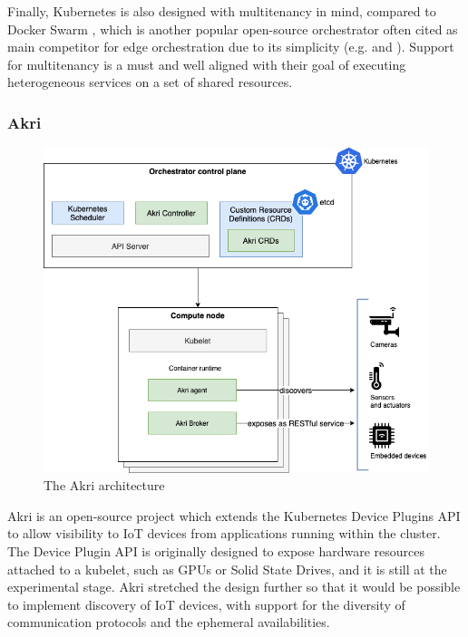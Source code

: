 Finally, Kubernetes is also designed with multitenancy in mind, compared to Docker Swarm \cite{docker-swarm}, which is another popular open-source orchestrator often cited as main competitor for edge orchestration due to its simplicity (e.g. \cite{containers-fog} and \cite{docker-edge-computing}). Support for multitenancy is a must and well aligned with their goal of executing heterogeneous services on a set of shared resources.

\subsubsection{Akri}
\label{sec:akri}

\begin{figure}[h]
\centering
\includegraphics[width=\columnwidth]{figures/akri}
\caption{The Akri architecture \label{fig:akri}}
\end{figure}

Akri \cite{akri} is an open-source project which extends the Kubernetes Device Plugins API \cite{k8s-device-plugins} to allow visibility to IoT devices from applications running within the cluster. The Device Plugin API is originally designed to expose hardware resources attached to a kubelet, such as GPUs or Solid State Drives, and it is still at the experimental stage. Akri stretched the design further so that it would be possible to implement discovery of IoT devices, with support for the diversity of communication protocols and the ephemeral availabilities.

